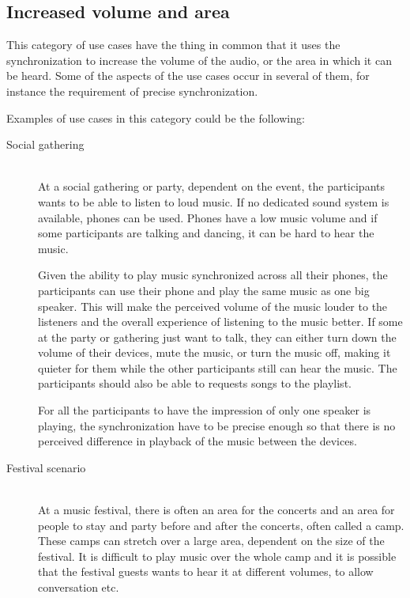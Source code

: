\subsection{Increased volume and area}
This category of use cases have the thing in common that it uses the synchronization to increase the volume of the audio, or the area in which it can be heard.
Some of the aspects of the use cases occur in several of them, for instance the requirement of precise synchronization.

Examples of use cases in this category could be the following:

\begin{description}
    \item[Social gathering] \hfill\\
        At a social gathering or party, dependent on the event, the participants wants to be able to listen to loud music.
        If no dedicated sound system is available, phones can be used. 
        Phones have a low music volume and if some participants are talking and dancing, it can be hard to hear the music.

        Given the ability to play music synchronized across all their phones, the participants can use their phone and play the same music as one big speaker.
        This will make the perceived volume of the music louder to the listeners and the overall experience of listening to the music better.
        If some at the party or gathering just want to talk, they can either turn down the volume of their devices, mute the music, or turn the music off,
        making it quieter for them while the other participants still can hear the music.
        The participants should also be able to requests songs to the playlist.

        For all the participants to have the impression of only one speaker is playing, 
        the synchronization have to be precise enough so that there is no perceived difference in playback of the music between the devices.

    \item[Festival scenario] \hfill\\
        At a music festival, there is often an area for the concerts and an area for people to stay and party before and after the concerts, often called a camp.
        These camps can stretch over a large area, dependent on the size of the festival.
        It is difficult to play music over the whole camp and it is possible that the festival guests wants to hear it at different volumes, to allow conversation etc.


\end{description}
